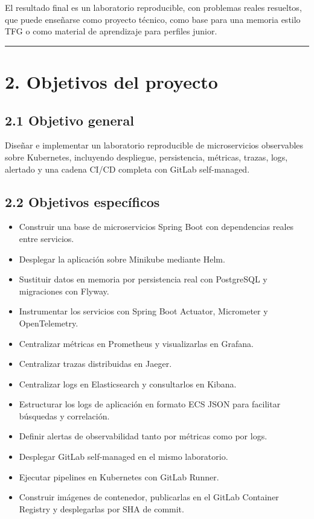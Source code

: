 \documentclass[
a4paper,
12pt]{report}
\providecommand{\tightlist}{%
  \setlength{\itemsep}{0pt}\setlength{\parskip}{0pt}}
\begin{document}
El resultado final es un laboratorio reproducible, con problemas reales
resueltos, que puede enseñarse como proyecto técnico, como base para una
memoria estilo TFG o como material de aprendizaje para perfiles junior.

\begin{center}\rule{0.5\linewidth}{0.5pt}\end{center}

\chapter{2. Objetivos del proyecto}\label{objetivos-del-proyecto}

\section{2.1 Objetivo general}\label{objetivo-general}

Diseñar e implementar un laboratorio reproducible de microservicios
observables sobre Kubernetes, incluyendo despliegue, persistencia,
métricas, trazas, logs, alertado y una cadena CI/CD completa con GitLab
self-managed.

\section{2.2 Objetivos específicos}\label{objetivos-especuxedficos}

\begin{itemize}
\tightlist
\item
  Construir una base de microservicios Spring Boot con dependencias
  reales entre servicios.
\item
  Desplegar la aplicación sobre Minikube mediante Helm.
\item
  Sustituir datos en memoria por persistencia real con PostgreSQL y
  migraciones con Flyway.
\item
  Instrumentar los servicios con Spring Boot Actuator, Micrometer y
  OpenTelemetry.
\item
  Centralizar métricas en Prometheus y visualizarlas en Grafana.
\item
  Centralizar trazas distribuidas en Jaeger.
\item
  Centralizar logs en Elasticsearch y consultarlos en Kibana.
\item
  Estructurar los logs de aplicación en formato ECS JSON para facilitar
  búsquedas y correlación.
\item
  Definir alertas de observabilidad tanto por métricas como por logs.
\item
  Desplegar GitLab self-managed en el mismo laboratorio.
\item
  Ejecutar pipelines en Kubernetes con GitLab Runner.
\item
  Construir imágenes de contenedor, publicarlas en el GitLab Container
  Registry y desplegarlas por SHA de commit.
\end{itemize}
\end{document}
